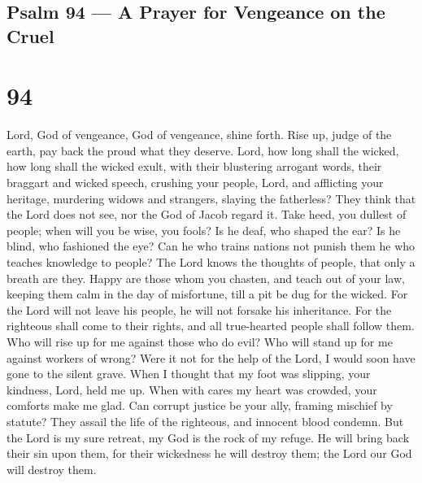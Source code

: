 \hypertarget{psalm-94-a-prayer-for-vengeance-on-the-cruel}{%
\subsection{Psalm 94 --- A Prayer for Vengeance on the
Cruel}\label{psalm-94-a-prayer-for-vengeance-on-the-cruel}}

\hypertarget{section-93}{%
\section{94}\label{section-93}}

 Lord, God of vengeance, God of vengeance, shine forth.
 Rise up, judge of the earth, pay back the proud what they
deserve.  Lord, how long shall the wicked, how long shall
the wicked exult,  with their blustering arrogant words,
their braggart and wicked speech,  crushing your people,
Lord, and afflicting your heritage,  murdering widows and
strangers, slaying the fatherless?  They think that the Lord
does not see, nor the God of Jacob regard it.  Take heed,
you dullest of people; when will you be wise, you fools?  Is
he deaf, who shaped the ear? Is he blind, who fashioned the eye?
 Can he who trains nations not punish them he who teaches
knowledge to people?  The Lord knows the thoughts of
people, that only a breath are they.  Happy are those whom
you chasten, and teach out of your law,  keeping them calm
in the day of misfortune, till a pit be dug for the wicked.
 For the Lord will not leave his people, he will not
forsake his inheritance.  For the righteous shall come to
their rights, and all true-hearted people shall follow them.
 Who will rise up for me against those who do evil? Who
will stand up for me against workers of wrong?  Were it not
for the help of the Lord, I would soon have gone to the silent grave.
 When I thought that my foot was slipping, your kindness,
Lord, held me up.  When with cares my heart was crowded,
your comforts make me glad.  Can corrupt justice be your
ally, framing mischief by statute?  They assail the life of
the righteous, and innocent blood condemn.  But the Lord is
my sure retreat, my God is the rock of my refuge.  He will
bring back their sin upon them, for their wickedness he will destroy
them; the Lord our God will destroy them.


